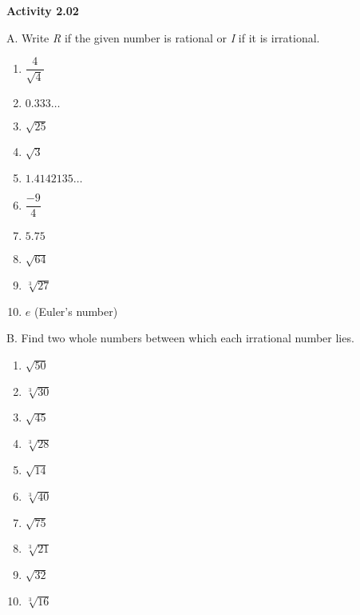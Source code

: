 \vspace{0.3ex}
\noindent\textbf{Activity 2.02}

\vspace{0.2ex}

A. Write \emph{R} if the given number is rational or \emph{I} if it is irrational.
\begin{multicols}{2}
\begin{enumerate}[noitemsep, label = \color{blue}\arabic*. ]
\item \(\dfrac{4}{\sqrt{4}}\)
\item \(0.333\ldots\)
\item \(\sqrt{25}\)
\item \(\sqrt{3}\)
\item \(1.4142135\ldots\)
\item \(\dfrac{-9}{4}\)
\item \(5.75\)
\item \(\sqrt{64}\)
\item \(\sqrt[{\scriptstyle 3}]{27}\)
\item \(e\) (Euler's number)
\end{enumerate}
\end{multicols}

B. Find two whole numbers between which each irrational number lies.

\begin{multicols}{2}
\begin{enumerate}[noitemsep, label = \color{blue}\arabic*. ]
\item \(\sqrt{50}\)
\item \(\sqrt[3]{30}\)
\item \(\sqrt{45}\)
\item \(\sqrt[3]{28}\)
\item \(\sqrt{14}\)
\item \(\sqrt[3]{40}\)
\item \(\sqrt{75}\)
\item \(\sqrt[3]{21}\)
\item \(\sqrt{32}\)
\item \(\sqrt[3]{16}\)
\end{enumerate}
\end{multicols}

